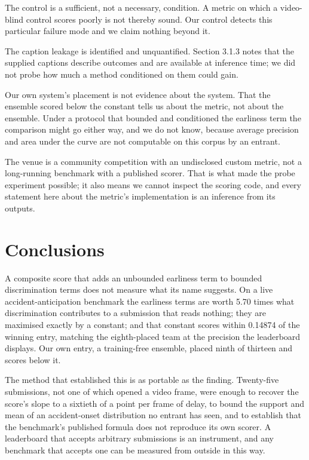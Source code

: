 The control is a sufficient, not a necessary, condition. A metric on which a video-blind control scores poorly is not thereby sound. Our control detects this particular failure mode and we claim nothing beyond it.

The caption leakage is identified and unquantified. Section 3.1.3 notes that the supplied captions describe outcomes and are available at inference time; we did not probe how much a method conditioned on them could gain.

Our own system's placement is not evidence about the system. That the ensemble scored below the constant tells us about the metric, not about the ensemble. Under a protocol that bounded and conditioned the earliness term the comparison might go either way, and we do not know, because average precision and area under the curve are not computable on this corpus by an entrant.

The venue is a community competition with an undisclosed custom metric, not a long-running benchmark with a published scorer. That is what made the probe experiment possible; it also means we cannot inspect the scoring code, and every statement here about the metric's implementation is an inference from its outputs.


\section{Conclusions}

A composite score that adds an unbounded earliness term to bounded discrimination terms does not measure what its name suggests. On a live accident-anticipation benchmark the earliness terms are worth 5.70 times what discrimination contributes to a submission that reads nothing; they are maximised exactly by a constant; and that constant scores within 0.14874 of the winning entry, matching the eighth-placed team at the precision the leaderboard displays. Our own entry, a training-free ensemble, placed ninth of thirteen and scores below it.

The method that established this is as portable as the finding. Twenty-five submissions, not one of which opened a video frame, were enough to recover the score's slope to a sixtieth of a point per frame of delay, to bound the support and mean of an accident-onset distribution no entrant has seen, and to establish that the benchmark's published formula does not reproduce its own scorer. A leaderboard that accepts arbitrary submissions is an instrument, and any benchmark that accepts one can be measured from outside in this way.

